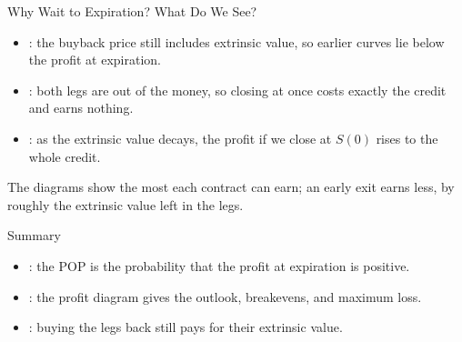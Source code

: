 \documentclass[aspectratio=169,11pt]{beamer}
\begin{document}
\begin{frame}{Why Wait to Expiration? What Do We See?}
  \begin{itemize}\setlength{\itemsep}{0.6em}
    \item {}: the buyback price still includes
      extrinsic value, so earlier curves lie below the profit at expiration.
    \item {}: both legs are out of the
      money, so closing at once costs exactly the credit and earns nothing.
    \item {}: as the extrinsic value decays, the profit if we
      close at $S(0)$ rises to the whole credit.
  \end{itemize}
  \vspace{0.4em}
  The diagrams show the most each contract can earn; an early exit earns less,
  by roughly the extrinsic value left in the legs.
\end{frame}

\begin{frame}{Summary}
  \vspace{0.3em}
  {\large\textbf{}}
  \begin{itemize}\setlength{\itemsep}{0.4em}
    \item {}: the POP
      is the probability that the profit at expiration is positive.
    \item {}:
      the profit diagram gives the outlook, breakevens, and maximum loss.
    \item {}: buying the legs back
      still pays for their extrinsic value.
  \end{itemize}
\end{frame}
\end{document}
